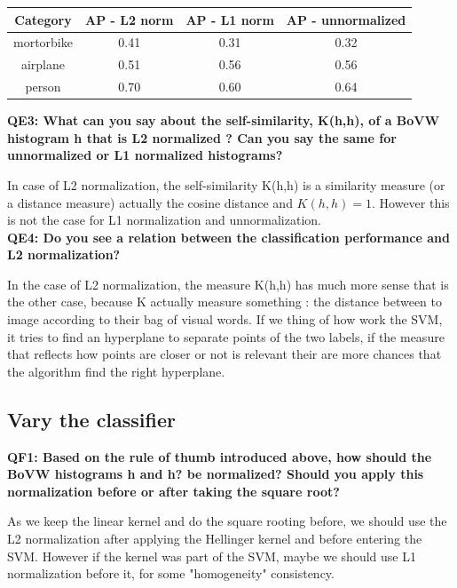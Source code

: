 \documentclass[a4paper,11pt]{exam}
\begin{document}
\begin{center}
	\begin{tabular}{ c | c | c | c }
   		 \hline
		   Category & AP - L2 norm &  AP - L1 norm & AP - unnormalized \\	
		   \hline
   		  mortorbike & 0.41 & 0.31 & 0.32 \\
  		  airplane & 0.51 & 0.56 & 0.56 \\
		  person & 0.70 & 0.60 & 0.64 \\
		\hline
 	\end{tabular}
\end{center}


\textbf{QE3: What can you say about the self-similarity, K(h,h), of a BoVW histogram h that is L2 normalized ? Can you say the same for unnormalized or L1 normalized histograms?\\}

In case of L2 normalization, the self-similarity K(h,h) is a similarity measure (or a distance measure) actually the cosine distance and $K(h,h) = 1$. However this is not the case for L1 normalization and unnormalization.\\

\textbf{QE4: Do you see a relation between the classification performance and L2 normalization?\\}

In the case of L2 normalization, the measure K(h,h) has much more sense that is the other case, because K actually measure something : the distance between to image according to their bag of visual words. If we thing of how work the SVM, it tries to find an hyperplane to separate points of the two labels, if the measure that reflects how points are closer or not is relevant their are more chances that the algorithm find the right hyperplane.

\subsection{Vary the classifier}

\textbf{QF1: Based on the rule of thumb introduced above, how should the BoVW histograms h and h? be normalized? Should you apply this normalization before or after taking the square root?\\}

As we keep the linear kernel and do the square rooting before, we should use the L2 normalization after applying the Hellinger kernel and before entering the SVM. However if the kernel was part of the SVM, maybe we should use L1 normalization before it, for some "homogeneity" consistency.\\
\end{document}
